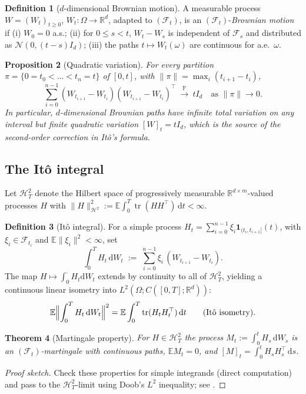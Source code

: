 \documentclass[11pt,letterpaper]{article}
\theoremstyle{plain}
\newtheorem{theorem}{Theorem}[section]
\newtheorem{proposition}[theorem]{Proposition}
\theoremstyle{definition}
\newtheorem{definition}[theorem]{Definition}
\theoremstyle{remark}
\newcommand{\R}{\mathbb{R}}
\newcommand{\E}{\mathbb{E}}
\newcommand{\Prob}{\mathbb{P}}
\newcommand{\ind}{\mathbf{1}}
\newcommand{\dd}{\mathrm{d}}
\newcommand{\calF}{\mathcal{F}}
\newcommand{\calN}{\mathcal{N}}
\newcommand{\calH}{\mathcal{H}}
\newcommand{\tr}{\operatorname{tr}}
\newcommand{\norm}[1]{\lVert #1\rVert}
\begin{document}
\begin{definition}[$d$-dimensional Brownian motion]\label{def:bm}
A measurable process $W=(W_t)_{t\ge 0}$, $W_t:\Omega\to\R^d$, adapted to
$(\calF_t)$, is an $(\calF_t)$-\emph{Brownian motion} if (i) $W_0=0$ a.s.;
(ii) for $0\le s<t$, $W_t-W_s$ is independent of $\calF_s$ and distributed
as $\calN(0,(t-s)I_d)$; (iii) the paths $t\mapsto W_t(\omega)$ are
continuous for a.e.\ $\omega$.
\end{definition}

\begin{proposition}[Quadratic variation]\label{prop:qv}
For every partition $\pi=\{0=t_0<\dots<t_n=t\}$ of $[0,t]$, with
$\norm{\pi}=\max_i(t_{i+1}-t_i)$,
\[
  \sum_{i=0}^{n-1}(W_{t_{i+1}}-W_{t_i})(W_{t_{i+1}}-W_{t_i})^\top\ \xrightarrow{\,\Prob\,}\ tI_d
  \quad\text{as }\norm{\pi}\to 0.
\]
In particular, $d$-dimensional Brownian paths have infinite total
variation on any interval but finite quadratic variation
$[W]_t=tI_d$, which is the source of the second-order correction in
It\^o's formula.
\end{proposition}

\subsection{The It\^o integral}\label{app:itoint}

Let $\calH^2_T$ denote the Hilbert space of progressively measurable
$\R^{d\times m}$-valued processes $H$ with
$\norm{H}_{\calH^2}^2:=\E\int_0^T\tr(HH^\top)\,\dd t<\infty$.

\begin{definition}[It\^o integral]\label{def:itoint}
For a simple process
$H_t=\sum_{i=0}^{n-1}\xi_i\ind_{(t_i,t_{i+1}]}(t)$, with $\xi_i\in
\calF_{t_i}$ and $\E\norm{\xi_i}^2<\infty$, set
\[
  \int_0^T H_t\,\dd W_t\;:=\;\sum_{i=0}^{n-1}\xi_i\,(W_{t_{i+1}}-W_{t_i}).
\]
The map $H\mapsto\int_0^{\cdot}H_t\dd W_t$ extends by continuity to all of
$\calH^2_T$, yielding a continuous linear isometry into
$L^2(\Omega;C([0,T];\R^d))$:
\begin{equation}
  \E\Bigl\lVert\int_0^T H_t\,\dd W_t\Bigr\rVert^2
  = \E\int_0^T\tr(H_tH_t^\top)\,\dd t
  \qquad(\text{It\^o isometry}).
  \label{eq:ito-isometry}
\end{equation}
\end{definition}

\begin{theorem}[Martingale property]\label{thm:ito-mart}
For $H\in\calH^2_T$ the process $M_t:=\int_0^t H_s\,\dd W_s$ is an
$(\calF_t)$-martingale with continuous paths, $\E M_t=0$, and
$[M]_t=\int_0^t H_sH_s^\top\,\dd s$.
\end{theorem}
\begin{proof}[Proof sketch]
Check these properties for simple integrands (direct computation) and pass
to the $\calH^2_T$-limit using Doob's $L^2$ inequality; see
\citep[Ch.~3]{karatzas1991bm}.
\end{proof}
\end{document}
